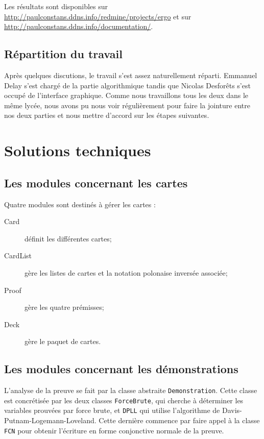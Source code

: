 \documentclass[12pt, algo]{cours}
\begin{document}
Les résultats sont disponibles sur \url{http://paulconstans.ddns.info/redmine/projects/ergo} et sur \url{http://paulconstans.ddns.info/documentation/}.

\subsection{Répartition du travail}

Après quelques discutions, le travail s'est assez naturellement réparti. Emmanuel Delay s'est chargé de la partie algorithmique tandis que Nicolas Desforêts s'est occupé de l'interface graphique. Comme nous travaillons tous les deux dans le même lycée, nous avons pu nous voir régulièrement pour faire la jointure entre nos deux parties et nous mettre d'accord sur les étapes suivantes.

\section{Solutions techniques}

\subsection{Les modules concernant les cartes}

Quatre modules sont destinés à gérer les cartes :

\begin{description}
\item[Card] définit les différentes cartes;
\item[CardList] gère les listes de cartes et la notation polonaise inversée associée;
\item[Proof] gère les quatre prémisses;
\item[Deck] gère le paquet de cartes.
\end{description}

\subsection{Les modules concernant les démonstrations}

L'analyse de la preuve se fait par la classe abstraite \texttt{Demonstration}. Cette classe est concrétisée par les deux classes \texttt{ForceBrute}, qui cherche à déterminer les \og variables prouvées \fg par force brute, et \texttt{DPLL} qui utilise l'algorithme de Davis-Putnam-Logemann-Loveland. Cette dernière commence par faire appel à la classe \texttt{FCN} pour obtenir l'écriture en forme conjonctive normale de la preuve.
\end{document}
